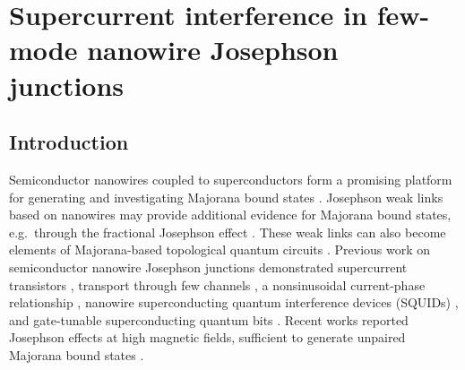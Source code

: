 \chapter{Supercurrent interference in few-mode nanowire Josephson junctions}
\label{ch:supercurrent}


\newpage
\noindent
\section{Introduction}

Semiconductor nanowires coupled to superconductors form a promising platform for generating and investigating Majorana bound states \cite{Kitaev2001,Oreg2010,Lutchyn2010,Mourik2012,Deng2016,Albrecht2016,Chen2017a}.
Josephson weak links based on nanowires may provide additional evidence for Majorana bound states, e.g.~through the fractional Josephson effect \cite{Wiedenmann2016,Bocquillon2016,Deacon2017}.
These weak links can also become elements of Majorana-based topological quantum circuits \cite{Hyart2013, Aasen2016, Karzig2017, Plugge2017}.
Previous work on semiconductor nanowire Josephson junctions demonstrated supercurrent transistors \cite{Doh2005}, transport through few channels \cite{Goffman2017}, a nonsinusoidal current-phase relationship \cite{Spanton2017}, nanowire superconducting quantum interference devices (SQUIDs) \cite{Dam2006,Szombati2016}, and gate-tunable superconducting quantum bits \cite{Lange2015,Larsen2015}.
Recent works reported Josephson effects at high magnetic fields, sufficient to generate unpaired Majorana bound states \cite{Szombati2016,Paajaste2015,Tiira2017,Gharavi2017}.

